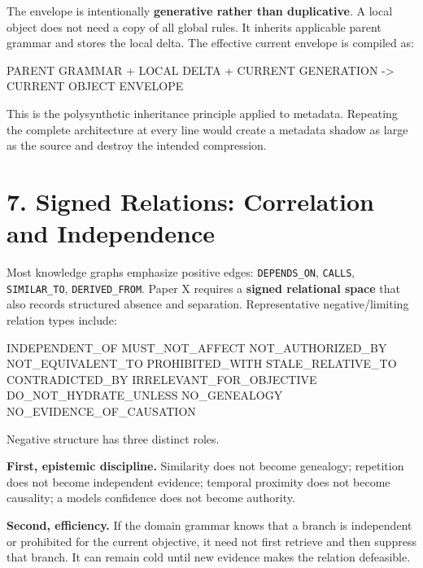 \documentclass[
  10pt,
  letterpaper,
]{article}
\newenvironment{Shaded}{}{}
\newcommand{\NormalTok}[1]{#1}
\begin{document}
The envelope is intentionally \textbf{generative rather than
duplicative}. A local object does not need a copy of all global rules.
It inherits applicable parent grammar and stores the local delta. The
effective current envelope is compiled as:

\begin{Shaded}
\begin{Highlighting}[]
\NormalTok{PARENT GRAMMAR + LOCAL DELTA + CURRENT GENERATION {-}\textgreater{} CURRENT OBJECT ENVELOPE}
\end{Highlighting}
\end{Shaded}

This is the polysynthetic inheritance principle applied to metadata.
Repeating the complete architecture at every line would create a
metadata shadow as large as the source and destroy the intended
compression.

\section{7. Signed Relations: Correlation and
Independence}\label{7-signed-relations-correlation-and-independence}

Most knowledge graphs emphasize positive edges: \nolinkurl{DEPENDS_ON},
\nolinkurl{CALLS}, \nolinkurl{SIMILAR_TO}, \nolinkurl{DERIVED_FROM}. Paper X
requires a \textbf{signed relational space} that also records structured
absence and separation. Representative negative/limiting relation types
include:

\begin{Shaded}
\begin{Highlighting}[]
\NormalTok{INDEPENDENT\_OF}
\NormalTok{MUST\_NOT\_AFFECT}
\NormalTok{NOT\_AUTHORIZED\_BY}
\NormalTok{NOT\_EQUIVALENT\_TO}
\NormalTok{PROHIBITED\_WITH}
\NormalTok{STALE\_RELATIVE\_TO}
\NormalTok{CONTRADICTED\_BY}
\NormalTok{IRRELEVANT\_FOR\_OBJECTIVE}
\NormalTok{DO\_NOT\_HYDRATE\_UNLESS}
\NormalTok{NO\_GENEALOGY}
\NormalTok{NO\_EVIDENCE\_OF\_CAUSATION}
\end{Highlighting}
\end{Shaded}

Negative structure has three distinct roles.

\textbf{First, epistemic discipline.} Similarity does not become
genealogy; repetition does not become independent evidence; temporal
proximity does not become causality; a model\textquotesingle s
confidence does not become authority.

\textbf{Second, efficiency.} If the domain grammar knows that a branch
is independent or prohibited for the current objective, it need not
first retrieve and then suppress that branch. It can remain cold until
new evidence makes the relation defeasible.
\end{document}
